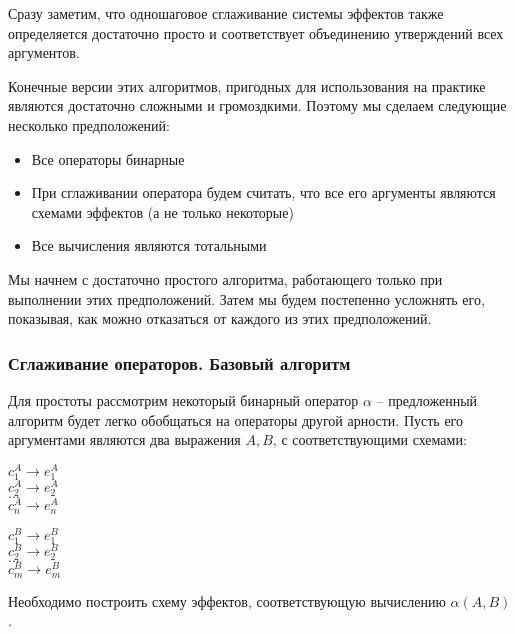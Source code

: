Сразу заметим, что одношаговое сглаживание системы эффектов также определяется достаточно просто и соответствует объединению утверждений всех аргументов. 

Конечные версии этих алгоритмов, пригодных для использования на практике являются достаточно сложными и громоздкими. Поэтому мы сделаем следующие несколько предположений:

\begin{itemize}
    \item Все операторы бинарные
    
    \item При сглаживании оператора будем считать, что все его аргументы являются схемами эффектов (а не только некоторые)
    
    \item Все вычисления являются тотальными
\end{itemize}

Мы начнем с достаточно простого алгоритма, работающего только при выполнении этих предположений. Затем мы будем постепенно усложнять его, показывая, как можно отказаться от каждого из этих предположений.




\subsubsection{Сглаживание операторов. Базовый алгоритм}

Для простоты рассмотрим некоторый бинарный оператор $\alpha$ -- предложенный алгоритм будет легко обобщаться на операторы другой арности. Пусть его аргументами являются два выражения $A, B$, с соответствующими схемами:

{
    $c^A_1 \rightarrow e^A_1$ \\
    $c^A_2 \rightarrow e^A_2$ \\
    $\ldots$ \\
    $c^A_n \rightarrow e^A_n$ \\
}{}

\bigskip

{
    $c^B_1 \rightarrow e^B_1$ \\
    $c^B_2 \rightarrow e^B_2$ \\
    $\ldots$ \\
    $c^B_m \rightarrow e^B_m$ \\        
}{}

Необходимо построить схему эффектов, соответствующую вычислению $\alpha(A, B)$. 



